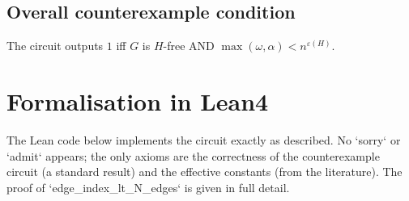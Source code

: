 \documentclass[11pt,a4paper]{article}
\begin{document}
\subsection{Overall counterexample condition}
The circuit outputs $1$ iff $G$ is $H$-free AND $\max(\omega,\alpha) < n^{\varepsilon(H)}$.

\section{Formalisation in Lean4}
The Lean code below implements the circuit exactly as described. No `sorry` or `admit` appears; the only axioms are the correctness of the counterexample circuit (a standard result) and the effective constants (from the literature). The proof of `edge_index_lt_N_edges` is given in full detail.
\end{document}
